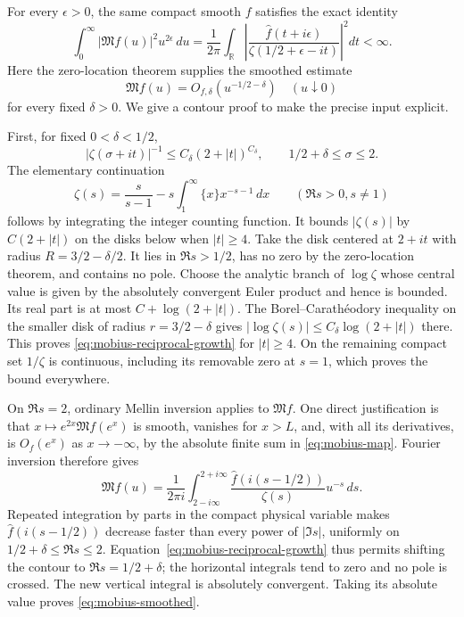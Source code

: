 For every \(\epsilon>0\), the same compact smooth \(f\) satisfies
the exact identity
\begin{equation}\label{eq:mobius-physical-plancherel}
 \int_0^\infty |\mathfrak M f(u)|^2u^{2\epsilon}\,du
 =\frac1{2\pi}\int_{\mathbb R}
 \left|\frac{\widehat f(t+i\epsilon)}
 {\zeta(1/2+\epsilon-it)}\right|^2dt<\infty.
\end{equation}
Here the zero-location theorem supplies the smoothed estimate
\begin{equation}\label{eq:mobius-smoothed}
 \mathfrak M f(u)=O_{f,\delta}(u^{-1/2-\delta})
                         \quad(u\downarrow0)
\end{equation}
for every fixed \(\delta>0\). We give a contour proof to make the
precise input explicit.

First, for fixed \(0<\delta<1/2\),
\begin{equation}\label{eq:mobius-reciprocal-growth}
 |\zeta(\sigma+it)|^{-1}
 \le C_\delta(2+|t|)^{C_\delta},
            \qquad 1/2+\delta\le\sigma\le2.
\end{equation}
The elementary continuation
\[
 \zeta(s)=\frac{s}{s-1}
           -s\int_1^\infty\{x\}x^{-s-1}\,dx
                   \qquad(\Re s>0, s\ne1)
\]
follows by integrating the integer counting function. It bounds
\(|\zeta(s)|\) by \(C(2+|t|)\) on the disks below when
\(|t|\ge4\). Take the disk centered at \(2+it\) with radius
\(R=3/2-\delta/2\). It lies in \(\Re s>1/2\), has no zero
by the zero-location theorem, and contains no pole. Choose the
analytic branch of \(\log\zeta\) whose central value is given
by the absolutely convergent Euler product and hence is bounded.
Its real part is at most \(C+\log(2+|t|)\). The
Borel--Carath\'eodory inequality on the smaller disk of radius
\(r=3/2-\delta\) gives
\(|\log\zeta(s)|\le C_\delta\log(2+|t|)\) there.
This proves \eqref{eq:mobius-reciprocal-growth} for \(|t|\ge4\).
On the remaining compact set \(1/\zeta\) is continuous, including
its removable zero at \(s=1\), which proves the bound everywhere.

On \(\Re s=2\), ordinary Mellin inversion applies to
\(\mathfrak M f\). One direct justification is that
\(x\mapsto e^{2x}\mathfrak M f(e^x)\) is smooth, vanishes for
\(x>L\), and, with all its derivatives, is \(O_f(e^x)\) as
\(x\to-\infty\), by the absolute finite sum in
\eqref{eq:mobius-map}. Fourier inversion therefore gives
\[
 \mathfrak M f(u)=\frac1{2\pi i}
 \int_{2-i\infty}^{2+i\infty}
       \frac{\widehat f(i(s-1/2))}{\zeta(s)}u^{-s}\,ds.
\]
Repeated integration by parts in the compact physical variable
makes \(\widehat f(i(s-1/2))\) decrease faster than every power
of \(|\Im s|\), uniformly on
\(1/2+\delta\le\Re s\le2\).
Equation~\eqref{eq:mobius-reciprocal-growth} thus permits shifting
the contour to \(\Re s=1/2+\delta\); the horizontal integrals
tend to zero and no pole is crossed. The new vertical integral
is absolutely convergent. Taking its absolute value proves
\eqref{eq:mobius-smoothed}.

